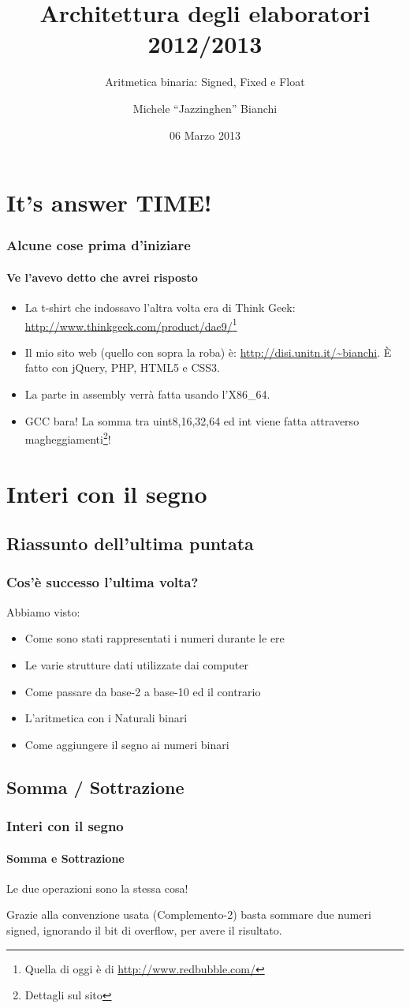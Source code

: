 \documentclass{beamer}
\title[Arch2013] %
{Architettura degli elaboratori 2012/2013}
\subtitle{Aritmetica binaria: Signed, Fixed e Float}
\author{Michele ``Jazzinghen'' Bianchi\inst{1}}
\institute[DISI] %
{
  \inst{1}%
  Dipartimento di Ingegneria e Scienze dell'Informazione\\
  Universtià degli Studi di Trento
}
\date[2013-03-06] %
{06 Marzo 2013}
\begin{document}
	\frame{\titlepage}
	\section{It's answer TIME!}
	\begin{frame}
    \frametitle{Alcune cose prima d'iniziare}
    \framesubtitle{Ve l'avevo detto che avrei risposto}
		\begin{itemize}
			\item La t-shirt che indossavo l'altra volta era di Think Geek: \url{http://www.thinkgeek.com/product/dae9/}\footnote{Quella
				di oggi è di \url{http://www.redbubble.com/}}
			\item Il mio sito web (quello con sopra la roba) è: \url{http://disi.unitn.it/~bianchi}. È fatto con
				jQuery, PHP, HTML5 e CSS3.
			\item La parte in assembly verrà fatta usando l'X86\_64.
			\item GCC bara! La somma tra uint{8,16,32,64} ed int viene fatta attraverso magheggiamenti\footnote{Dettagli sul sito}!
		\end{itemize}
	\end{frame}   
   
  \section[Being negative]{Interi con il segno}
	\subsection{Riassunto dell'ultima puntata}  
  \begin{frame}
    \frametitle{Cos'è successo l'ultima volta?}
		Abbiamo visto:    
    \begin{itemize}
    		\item Come sono stati rappresentati i numeri durante le ere
    		\item Le varie strutture dati utilizzate dai computer
    		\item Come passare da base-2 a base-10 ed il contrario
    		\item L'aritmetica con i Naturali binari
    		\item Come aggiungere il segno ai numeri binari
    \end{itemize}
  \end{frame}
	
	\subsection{Somma / Sottrazione}
  \begin{frame}
    \frametitle{Interi con il segno}
    \framesubtitle{Somma e Sottrazione}
    Le due operazioni sono la stessa cosa!
    
		\vspace{2em}    
    
    Grazie alla convenzione usata (Complemento-2) basta sommare due numeri signed, 
    ignorando il bit di overflow, per avere il risultato.
  \end{frame}
  
\end{document}
